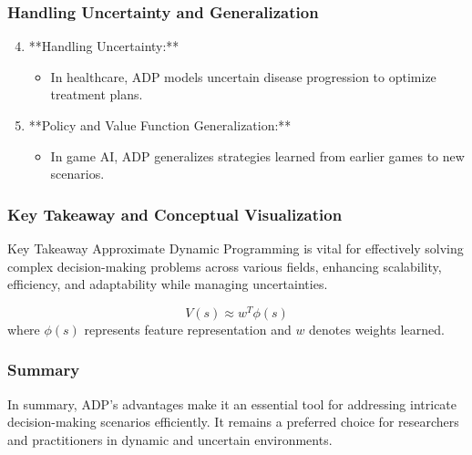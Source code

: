 \documentclass[aspectratio=169]{beamer}
\begin{document}
\begin{frame}[fragile]
    \frametitle{Handling Uncertainty and Generalization}
    \begin{enumerate}
        \setcounter{enumi}{3}
        \item **Handling Uncertainty:** 
            \begin{itemize}
                \item In healthcare, ADP models uncertain disease progression to optimize treatment plans.
            \end{itemize}
        \item **Policy and Value Function Generalization:** 
            \begin{itemize}
                \item In game AI, ADP generalizes strategies learned from earlier games to new scenarios.
            \end{itemize}
    \end{enumerate}
\end{frame}

\begin{frame}[fragile]
    \frametitle{Key Takeaway and Conceptual Visualization}
    \begin{block}{Key Takeaway}
        Approximate Dynamic Programming is vital for effectively solving complex decision-making problems across various fields, enhancing scalability, efficiency, and adaptability while managing uncertainties.
    \end{block}

    \begin{equation}
        V(s) \approx w^T \phi(s)
    \end{equation}
    where \( \phi(s) \) represents feature representation and \( w \) denotes weights learned.
\end{frame}

\begin{frame}[fragile]
    \frametitle{Summary}
    In summary, ADP's advantages make it an essential tool for addressing intricate decision-making scenarios efficiently. It remains a preferred choice for researchers and practitioners in dynamic and uncertain environments.
\end{frame}
\end{document}
